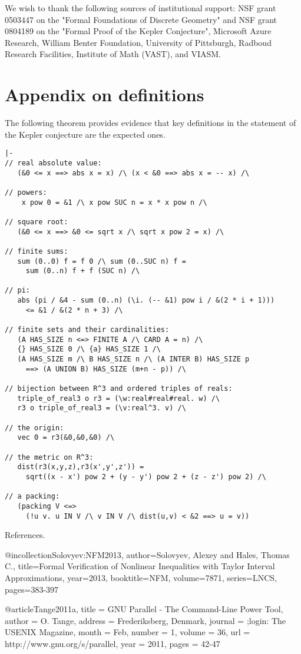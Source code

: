 We wish to thank the following sources of institutional support: NSF
grant 0503447 on the "Formal Foundations of Discrete Geometry" and NSF
grant 0804189 on the "Formal Proof of the Kepler Conjecture",
Microsoft Azure Research, William Benter Foundation, University of
Pittsburgh, Radboud Research Facilities, Institute of Math (VAST), and
VIASM.


\newpage
\section{Appendix on definitions}

The following theorem provides evidence that key definitions in the
statement of the Kepler conjecture are the expected ones.

\begin{obeylines}

\begin{verbatim}
|-  
// real absolute value:
   (&0 <= x ==> abs x = x) /\ (x < &0 ==> abs x = -- x) /\   

// powers:
    x pow 0 = &1 /\ x pow SUC n = x * x pow n /\

// square root:
   (&0 <= x ==> &0 <= sqrt x /\ sqrt x pow 2 = x) /\ 

// finite sums:
   sum (0..0) f = f 0 /\ sum (0..SUC n) f =  
     sum (0..n) f + f (SUC n) /\ 

// pi:
   abs (pi / &4 - sum (0..n) (\i. (-- &1) pow i / &(2 * i + 1))) 
     <= &1 / &(2 * n + 3) /\

// finite sets and their cardinalities:
   (A HAS_SIZE n <=> FINITE A /\ CARD A = n) /\
   {} HAS_SIZE 0 /\ {a} HAS_SIZE 1 /\ 
   (A HAS_SIZE m /\ B HAS_SIZE n /\ (A INTER B) HAS_SIZE p 
     ==> (A UNION B) HAS_SIZE (m+n - p)) /\

// bijection between R^3 and ordered triples of reals:
   triple_of_real3 o r3 = (\w:real#real#real. w) /\
   r3 o triple_of_real3 = (\v:real^3. v) /\ 

// the origin:
   vec 0 = r3(&0,&0,&0) /\

// the metric on R^3:
   dist(r3(x,y,z),r3(x',y',z')) = 
     sqrt((x - x') pow 2 + (y - y') pow 2 + (z - z') pow 2) /\

// a packing:
   (packing V <=> 
     (!u v. u IN V /\ v IN V /\ dist(u,v) < &2 ==> u = v))
\end{verbatim}

\end{obeylines}



References.

@incollection{Solovyev:NFM2013,
  author={Solovyev, Alexey and Hales, Thomas C.},
  title={{Formal Verification of Nonlinear Inequalities with Taylor Interval 	Approximations}},
  year={2013},
  booktitle={NFM},
  volume={7871},
  series={LNCS},
  pages={383-397}
}

@article{Tange2011a,
  title = {GNU Parallel - The Command-Line Power Tool},
  author = {O. Tange},
  address = {Frederiksberg, Denmark},
  journal = {;login: The USENIX Magazine},
  month = {Feb},
  number = {1},
  volume = {36},
  url = {http://www.gnu.org/s/parallel},
  year = {2011},
  pages = {42-47}
}